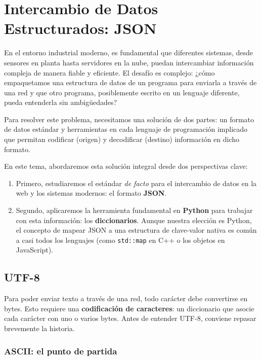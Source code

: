 \section{Intercambio de Datos Estructurados: JSON}

En el entorno industrial moderno, es fundamental que diferentes sistemas, desde sensores en planta hasta servidores en la nube, puedan intercambiar información compleja de manera fiable y eficiente. El desafío es complejo: ¿cómo empaquetamos una estructura de datos de un programa para enviarla a través de una red y que otro programa, posiblemente escrito en un lenguaje diferente, pueda entenderla sin ambigüedades?

Para resolver este problema, necesitamos una solución de dos partes: un formato de datos estándar y herramientas en cada lenguaje de programación implicado que permitan codificar (origen) y decodificar (destino) información en dicho formato.

En este tema, abordaremos esta solución integral desde dos perspectivas clave:
\begin{enumerate}
    \item Primero, estudiaremos el estándar \textit{de facto} para el intercambio de datos en la web y los sistemas modernos: el formato \textbf{JSON}.
    \item Segundo, aplicaremos la herramienta fundamental en \textbf{Python} para trabajar con esta información: los \textbf{diccionarios}. Aunque nuestra elección es Python, el concepto de mapear JSON a una estructura de clave-valor nativa es común a casi todos los lenguajes (como \texttt{std::map} en C++ o los objetos en JavaScript).

\end{enumerate}

\subsection{UTF-8}

Para poder enviar texto a través de una red, todo carácter debe convertirse en bytes. Esto requiere una \textbf{codificación de caracteres}: un diccionario que asocie cada carácter con uno o varios bytes. Antes de entender UTF-8, conviene repasar brevemente la historia.

\subsubsection{ASCII: el punto de partida}

